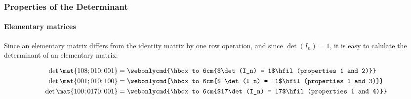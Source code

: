 
\begin{frame}
\frametitle{Properties of the Determinant}
\framesubtitle{Elementary matrices}

Since an elementary matrix differs from the identity matrix by one row
operation, and since $\det(I_n) = 1$, it is easy to calulate the determinant of
an elementary matrix:

\pause\bigskip
\[\begin{aligned}
  \det\mat{1 0 8; 0 1 0; 0 0 1} &=
  \webonlycmd{\hbox to 6cm{$\det(I_n) = 1$\hfil (properties 1 and 2)}} \\
  \det\mat{0 0 1; 0 1 0; 1 0 0} &=
  \webonlycmd{\hbox to 6cm{$-\det(I_n) = -1$\hfil (properties 1 and 3)}} \\
  \det\mat{1 0 0; 0 17 0; 0 0 1} &=
  \webonlycmd{\hbox to 6cm{$17\det(I_n) = 17$\hfil (properties 1 and 4)}}  
\end{aligned}\]

\end{frame}



